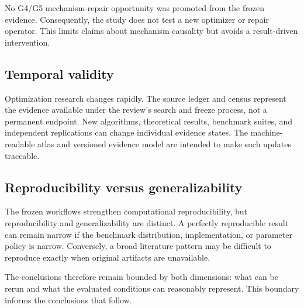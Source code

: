No G4/G5 mechanism-repair opportunity was promoted from the frozen evidence. Consequently, the study does not test a new optimizer or repair operator. This limits claims about mechanism causality but avoids a result-driven intervention.

\subsection{Temporal validity}

Optimization research changes rapidly. The source ledger and census represent the evidence available under the review's search and freeze process, not a permanent endpoint. New algorithms, theoretical results, benchmark suites, and independent replications can change individual evidence states. The machine-readable atlas and versioned evidence model are intended to make such updates traceable.

\subsection{Reproducibility versus generalizability}

The frozen workflows strengthen computational reproducibility, but reproducibility and generalizability are distinct. A perfectly reproducible result can remain narrow if the benchmark distribution, implementation, or parameter policy is narrow. Conversely, a broad literature pattern may be difficult to reproduce exactly when original artifacts are unavailable.

The conclusions therefore remain bounded by both dimensions: what can be rerun and what the evaluated conditions can reasonably represent. This boundary informs the conclusions that follow.
